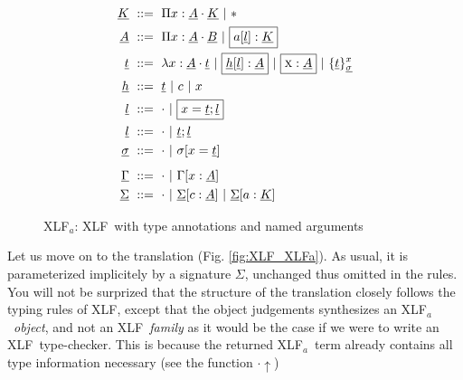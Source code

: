 \documentclass[preprint]{sigplanconf}
\newcommand\memph[1]{\boxed{#1}}
\newcommand\anonarg{\cdot}
\newcommand\gor{\ |\ }
\newcommand\gequal{\ ::=\ }
\newcommand\meta[1]{\textsc{#1}}
\newcommand\typ[2]{{#1}:{#2}}
\newcommand\mv{x}
\newcommand\mmeta{\meta x}
\newcommand\mco{c}
\newcommand\mcf{a}
\newcommand\postbinder{\cdot}
\newcommand\prd[2]{\Pi{#1}:{#2}\postbinder}
\newcommand\tlam[2]{\lambda{#1}:{#2}\postbinder}
\newcommand\lam{\tlam}
\newcommand\obox[3]{\{{#1}\}^{#2}_{#3}}
\newcommand\srt[1]{\mathsf{#1}}
\newcommand\type{\srt *}
\newcommand\laapp[3]{{#1}[{#2}]:{#3}}
\newcommand\lnil{\cdot}
\newcommand\lcons[2]{{#1};{#2}}
\newcommand\lncons[3]{{#1}={#2};{#3}}
\newcommand\enil\cdot
\newcommand\eent[1]{[{#1}]}
\newcommand\econs[2]{{#1}\eent{#2}}
\newcommand\ebinddecl[3]{\econs{#1}{{#2}:{#3}}}
\newcommand\snil\enil
\newcommand\sent[2]{[{#1}={#2}]}
\newcommand\scons[3]{{#1}\sent{#2}{#3}}
\newcommand\lang[1]{\textsf{#1}}
\newcommand\XLF{\lang{XLF}}
\newcommand\XLFa{\lang{XLF$_a$}}
\newcommand\XLFamod[1]{\underline{#1}}
\def\inXLFa{\def\thelangmod{\XLFamod}}
\newcommand\mk{\thelangmod{K}}
\newcommand\mf{\thelangmod{A}}
\newcommand\mmf{\thelangmod{B}}
\newcommand\mo{\thelangmod{t}}
\newcommand\mh{\thelangmod{h}}
\newcommand\ma{\thelangmod{l}}
\newcommand\ms{\thelangmod{\sigma}}
\newcommand\me{\thelangmod{\Gamma}}
\newcommand\msi{\thelangmod{\Sigma}}
\newcommand\typeof[1]{{#1}\uparrow}
\begin{document}
\begin{figure}
  \inXLFa
  \begin{align*}
    \mk &\gequal { \prd\mv\mf\mk
      \gor \type } \\
    \mf &\gequal { \prd\mv\mf\mmf
      \gor \memph{\laapp\mcf\ma\mk} } \\
    \mo &\gequal { \lam\mv\mf\mo
      \gor \memph{\laapp\mh\ma\mf}
      \gor \memph{\typ\mmeta\mf}
      \gor \obox\mo\mv\ms } \\
    \mh &\gequal { \mo
      \gor \mco
      \gor \mv } \\
    \ma &\gequal {\lnil
      \gor \memph{\lncons \mv\mo\ma}} \\
    \ma &\gequal { \lnil
      \gor \lcons\mo\ma } \\
    \ms &\gequal { \snil
      \gor \scons \sigma\mv\mo } \\[0.5em]
    \me &\gequal { \enil
      \gor \ebinddecl \Gamma\mv\mf } \\
    \msi &\gequal { \enil
      \gor \ebinddecl\msi\mco\mf
      \gor \ebinddecl\msi\mcf\mk }
  \end{align*}
  \caption{\XLFa: \XLF\ with type annotations and named arguments}
\label{fig:XLFa}
\end{figure}

Let us move on to the translation (Fig. \ref{fig:XLF_XLFa}). As usual,
it is parameterized implicitely by a signature $\Sigma$, unchanged
thus omitted in the rules. You will not be surprized that the
structure of the translation closely follows the typing rules of \XLF,
except that the object judgements synthesizes an \XLFa\ \emph{object},
and not an \XLF\ \emph{family} as it would be the case if we were to
write an \XLF\ type-checker. This is because the returned \XLFa\ term
already contains all type information necessary (see the function
$\typeof\anonarg$)
\end{document}
